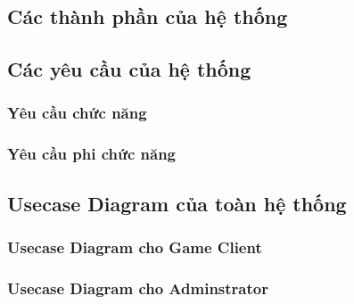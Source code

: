 \subsection{Các thành phần của hệ thống}

\subsection{Các yêu cầu của hệ thống}
\subsubsection{Yêu cầu chức năng}
\subsubsection{Yêu cầu phi chức năng}

\subsection{Usecase Diagram của toàn hệ thống}
\subsubsection{Usecase Diagram cho Game Client}
\subsubsection{Usecase Diagram cho Adminstrator}